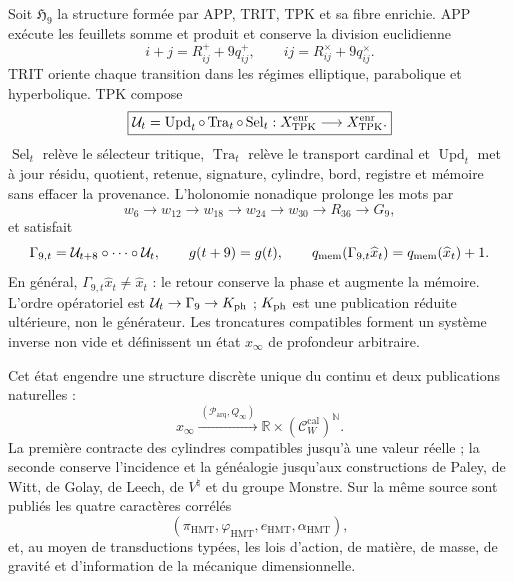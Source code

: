 \begin{theorem}
Soit \(\mathfrak H_9\) la structure formée par APP, TRIT, TPK et sa fibre
enrichie. APP exécute les feuillets somme et produit et conserve la division
euclidienne
\[
i+j=R^+_{ij}+9q^+_{ij},
\qquad
ij=R^\times_{ij}+9q^\times_{ij}.
\]
TRIT oriente chaque transition dans les régimes elliptique, parabolique et
hyperbolique. TPK compose
\[
    \boxed{\mathcal U_t
    =\operatorname{Upd}_t\circ\operatorname{Tra}_t
     \circ\operatorname{Sel}_t:
     X_{\rm TPK}^{\rm enr}\longrightarrow X_{\rm TPK}^{\rm enr}.}
\]
\(\operatorname{Sel}_t\) relève le sélecteur tritique,
\(\operatorname{Tra}_t\) relève le transport cardinal et
\(\operatorname{Upd}_t\) met à jour résidu, quotient, retenue, signature,
cylindre, bord, registre et mémoire sans effacer la provenance.
L'holonomie nonadique prolonge les mots par
\[
w_6\longrightarrow w_{12}\longrightarrow w_{18}\longrightarrow w_{24}
\longrightarrow w_{30}\longrightarrow R_{36}\longrightarrow G_9,
\]
et satisfait
\[
    \Gamma_{9,t}=\mathcal U_{t+8}\circ\cdots\circ\mathcal U_t,\qquad
    g(t+9)=g(t),
    \qquad q_{\rm mem}(\Gamma_{9,t}\widehat x_t)
    =q_{\rm mem}(\widehat x_t)+1.
\]
En général, \(\Gamma_{9,t}\widehat x_t\ne\widehat x_t\) : le retour conserve
la phase et augmente la mémoire. L'ordre opératoriel est
\(\mathcal U_t\to\Gamma_9\to K_{\rm ph}\) ; \(K_{\rm ph}\) est une publication
réduite ultérieure, non le générateur. Les troncatures
compatibles forment un système inverse non vide et définissent un état
\(x_\infty\) de profondeur arbitraire.

Cet état engendre une structure discrète unique du continu et deux
publications naturelles :
\begin{equation}
x_\infty
\xrightarrow{\ (\mathcal P_{\mathrm{arq}},Q_\infty)\ }
\mathbb R\times(\mathscr C_W^{\mathrm{cal}})^{\mathbb N}.
\label{eq:frontal-doble-proyeccion}
\end{equation}
La première contracte des cylindres compatibles jusqu'à une valeur réelle ; la seconde
conserve l'incidence et la généalogie jusqu'aux constructions de Paley, de Witt,
de Golay, de Leech, de \(V^\natural\) et du groupe Monstre. Sur la même source sont
publiés les quatre caractères corrélés
\[
(\pi_{\mathrm{HMT}},\varphi_{\mathrm{HMT}},
e_{\mathrm{HMT}},\alpha_{\mathrm{HMT}}),
\]
et, au moyen de transductions typées, les lois d'action, de matière, de masse,
de gravité et d'information de la mécanique dimensionnelle.
\end{theorem}

